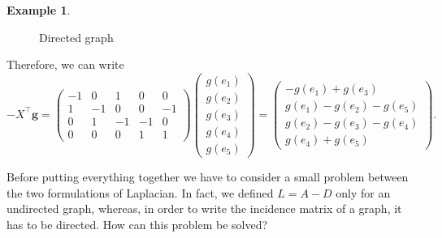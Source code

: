 \documentclass[12pt,a4paper]{report}
\theoremstyle{definition}
\newtheorem{example}{Example}[chapter]
\begin{document}
\begin{example}
\begin{figure}[b]
    \caption{Directed graph}
    \label{fig:graph_divergence_2}
\end{figure}
Therefore, we can write
\begin{equation*}
    - X^\top \mathbf{g} = 
    \begin{pmatrix}
    -1 & 0 & 1 & 0 & 0 \\
    1 & -1 & 0 & 0 & -1 \\
    0 & 1 & -1 & -1 & 0 \\
    0 & 0 & 0 & 1 & 1
    \end{pmatrix}
    \begin{pmatrix}
    g(e_1) \\
    g(e_2) \\
    g(e_3) \\
    g(e_4) \\
    g(e_5) 
    \end{pmatrix} = 
    \begin{pmatrix}
    -g(e_1) + g(e_3)  \\
    g(e_1) - g(e_2) - g(e_5)  \\
    g(e_2) - g(e_3) - g(e_4)  \\
    g(e_4) + g(e_5)  
    \end{pmatrix} .
\end{equation*}
\end{example}


Before putting everything together we have to consider a small problem between the two formulations of Laplacian.
In fact, we defined $L=A-D$ only for an undirected graph, whereas, in order to write the incidence matrix of a graph, it has to be directed. How can this problem be solved?
\end{document}

